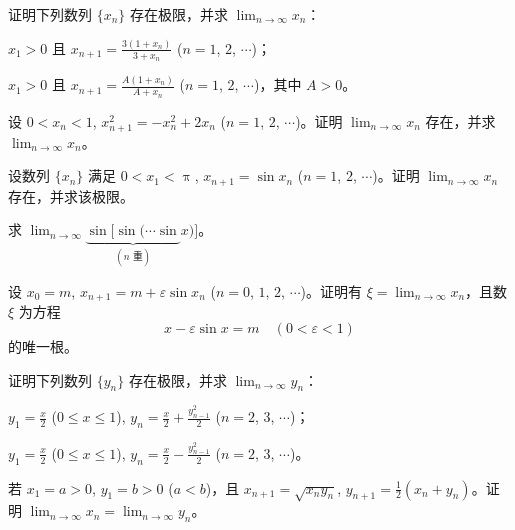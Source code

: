 	\begin{ti}
		证明下列数列 $\{x_n\}$ 存在极限，并求 $\lim_{n \to \infty} x_n$：
		\begin{xiaoti}
			\item $x_1>0$ 且 $x_{n+1} = \frac{3(1+x_n)}{3+x_n}$ ($n=1$, $2$, $\cdots$)；
			\item $x_1>0$ 且 $x_{n+1} = \frac{A(1+x_n)}{A+x_n}$ ($n=1$, $2$, $\cdots$)，其中 $A>0$。
		\end{xiaoti}
	\end{ti}

	\begin{ti}
		设 $0<x_n<1$, $x_{n+1}^2 = -x_n^2 + 2x_n$ ($n=1$, $2$, $\cdots$)。证明 $\lim_{n \to \infty} x_n$ 存在，并求 $\lim_{n \to \infty} x_n$。
	\end{ti}

	\begin{ti}
		设数列 $\{x_n\}$ 满足 $0<x_1<\uppi$, $x_{n+1} = \sin x_n$ ($n=1$, $2$, $\cdots$)。证明 $\lim_{n \to \infty} x_n$ 存在，并求该极限。
		\begin{bianshi}
			求 $\lim_{n \to \infty} \underbrace{\sin[\sin(\cdots \sin}_{(n \text{ 重})} x)]$。
		\end{bianshi}
	\end{ti}

	\begin{ti}
		设 $x_0 = m$, $x_{n+1} = m + \varepsilon \sin x_n$ ($n=0$, $1$, $2$, $\cdots$)。证明有 $\xi = \lim_{n \to \infty} x_n$，且数 $\xi$ 为方程
		\[ x - \varepsilon \sin x = m\quad (0<\varepsilon<1) \]
		的唯一根。
	\end{ti}

	\begin{ti}
		证明下列数列 $\{y_n\}$ 存在极限，并求 $\lim_{n \to \infty} y_n$：
		\begin{xiaoti}
			\item $y_1 = \frac{x}{2}$ ($0 \leq x \leq 1$), $y_n = \frac{x}{2} + \frac{y_{n-1}^2}{2}$ ($n=2$, $3$, $\cdots$)；
			\item $y_1 = \frac{x}{2}$ ($0 \leq x \leq 1$), $y_n = \frac{x}{2} - \frac{y_{n-1}^2}{2}$ ($n=2$, $3$, $\cdots$)。
		\end{xiaoti}
	\end{ti}

	\begin{ti}
		若 $x_1 = a > 0$, $y_1 = b > 0$ ($a < b$)，且 $x_{n+1} = \sqrt{x_n y_n}$, $y_{n+1} = \frac{1}{2}(x_n+y_n)$。证明 $\lim_{n \to \infty} x_n = \lim_{n \to \infty} y_n$。
	\end{ti}

